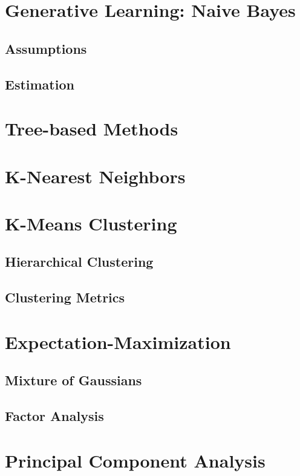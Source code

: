\documentclass[twoside,twocolumn]{article}
\begin{document}
\section{Generative Learning: Naive Bayes}
\subsection{Assumptions}
\subsection{Estimation}
\section{Tree-based Methods}
\section{K-Nearest Neighbors}
\section{K-Means Clustering}
\subsection{Hierarchical Clustering}
\subsection{Clustering Metrics}
\section{Expectation-Maximization}
\subsection{Mixture of Gaussians}
\subsection{Factor Analysis}
\section{Principal Component Analysis}
\end{document}
